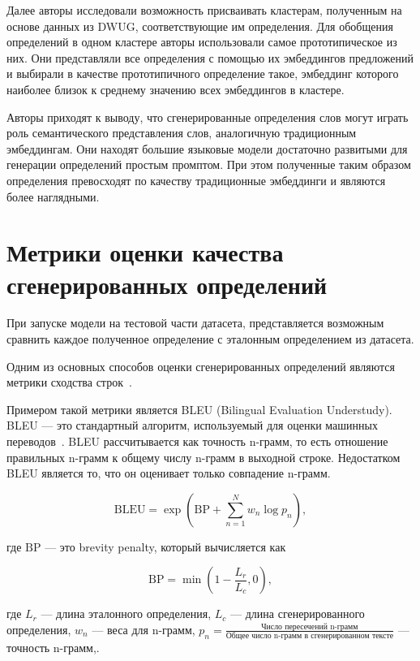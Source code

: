 \documentclass[LI,VKR]{HSEUniversity}
\begin{document}
Далее авторы исследовали возможность присваивать кластерам, полученным на основе данных из DWUG,
соответствующие им определения.
Для обобщения определений в одном кластере авторы использовали самое прототипическое из них.
Они представляли все определения с помощью их эмбеддингов предложений и выбирали в качестве
прототипичного определение такое, эмбеддинг которого наиболее близок к среднему значению всех
эмбеддингов в кластере.

Авторы приходят к выводу, что сгенерированные определения слов могут играть роль
семантического представления слов, аналогичную традиционным эмбеддингам.
Они находят большие языковые модели достаточно развитыми для генерации определений
простым промптом.
При этом полученные таким образом определения превосходят по качеству
традиционные эмбеддинги и являются более наглядными.

\section{Метрики оценки качества сгенерированных определений}

При запуске модели на тестовой части датасета,
представляется возможным сравнить каждое полученное определение с эталонным определением из датасета.

Одним из основных способов оценки сгенерированных определений являются метрики
сходства строк~\cite{DefinitionModelingReviewAndDatasetAnalysis}.

Примером такой метрики является BLEU (Bilingual Evaluation Understudy).
BLEU — это стандартный алгоритм, используемый для оценки машинных переводов~\cite{BLUE}.
BLEU рассчитывается как точность n-грамм, то есть отношение правильных n-грамм к общему числу n-грамм в выходной строке.
Недостатком BLEU является то, что он оценивает только совпадение n-грамм.

\begin{equation}
\text{BLEU} = \exp \left( \text{BP} + \sum_{n=1}^{N} w_n \log p_n \right),
\end{equation}

где \(\text{BP}\) — это brevity penalty, который вычисляется как

\begin{equation}
\text{BP} = \min\left(1 - \frac{L_r}{L_c}, 0 \right),
\end{equation}

где \(L_r\) — длина эталонного определения,
\(L_c\) — длина сгенерированного определения,
\(w_n\) — веса для n-грамм,
\(p_n = \frac{\text{Число пересечений n-грамм}}{\text{Общее число n-грамм в сгенерированном тексте}}\) — точность n-грамм,.
\end{document}
